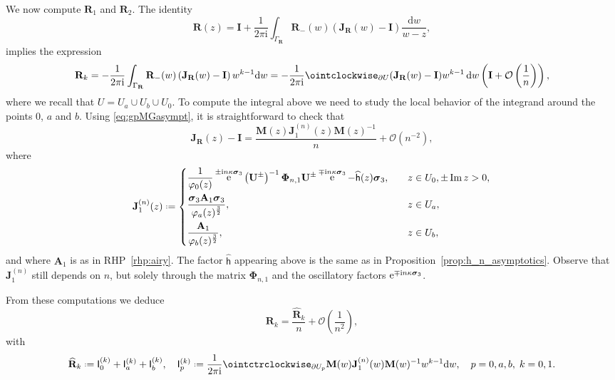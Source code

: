 \documentclass[reqno,a4paper,11pt]{amsart}
\DeclareMathOperator{\im}{Im}
\DeclareMathOperator{\ee}{\rm e}
\newcommand{\Boh}{\mathcal{O}}
\newcommand{\ii}{\mathrm{i}}
\newcommand{\dd}{\mathrm{d}}
\newcommand*{\deff}{\mathrel{\vcenter{\baselineskip0.5ex \lineskiplimit0pt
                     \hbox{\scriptsize.}\hbox{\scriptsize.}}}%
                     =}
\renewcommand{\bm}{\mathbf}
\newcommand{\msf}{\mathsf}
\newcommand{\wh}{\widehat}
\renewcommand{\sp}{\boldsymbol \sigma}
\theoremstyle{definition}
\theoremstyle{remark}
\numberwithin{equation}{section}
\newcommand*{\defeq}{\mathrel{\vcenter{\baselineskip0.5ex \lineskiplimit0pt
                     \hbox{\scriptsize.}\hbox{\scriptsize.}}}%
                     =}
\begin{document}
 We now compute $\bm R_1$ and $\bm R_2$. The identity
    \[
        \bm R(z) = \bm I + \frac{1}{2 \pi \ii} \int_{\Gamma_\bm R} \bm R_-(w) \left( \bm J_{\bm R}(w) - \bm I \right) \frac{\dd w}{w-z}, 
    \]
    implies the expression
    \[
        \bm R_k 
            = - \frac{1}{2 \pi \ii} \int_{\Gamma_\bm R} \bm R_-(w) \left( \bm J_{\bm R}(w) - \bm I \right) w^{k-1} \dd w 
            = - \frac{1}{2 \pi \ii} \ointclockwise_{\partial U} (\bm J_{\bm R}(w) - \bm I) w^{k-1}\, \dd w 
            \left( \bm I +  \Boh \left( \frac{1}{n}\right) \right),
    \]    
    where we recall that $U=U_a\cup U_b\cup U_0$.
    To compute the integral above we need to study the local behavior of the integrand around the points $0$, $a$ and $b$. Using \eqref{eq:gpMGasympt}, 
    it is straightforward to check that
    \[
        \bm J_{\bm R}(z) - \bm I = \frac{\bm M(z)\bm J_1^{(n)}(z)\bm M(z)^{-1}}{n} 
        + \Boh(n^{-2}),
    \]
    where
    \begin{equation}\label{eq:J1n}
        \bm J_1^{(n)}(z) \defeq 
            \begin{dcases}
                \frac{1}{\varphi_0(z)}\ee^{\pm \ii n\kappa \sp_3}\left(\bm U^{\pm} \right)^{-1} \bm \Phi_{n,1} \bm U^{\pm} \ee^{\mp \ii n\kappa \sp_3} -\widehat{\msf h}(z) \sp_3 , \quad 
                &z \in U_0, \pm \im z>0, \\
                  \frac{\sp_3 \bm A_1 \sp_3 }{ \varphi_a(z)^{\frac{3}{2}}}, \quad 
                &z \in U_a, \\
                 \frac{\bm A_1 }{ \varphi_b(z)^{\frac{3}{2}}}, \quad 
                &z \in U_b,
            \end{dcases}
    \end{equation}
    and where $\bm A_1$ is as in RHP~\ref{rhp:airy}.
    The factor $\wh{\msf h}$ appearing above is the same as in Proposition~\ref{prop:h_n_asymptotics}. Observe that $\bm J_1^{(n)}$ still depends on $n$, but solely through the matrix $\bm \Phi_{n,1}$ and the oscillatory factors $\ee^{\mp \ii n\kappa \sp_3}$.

From these computations we deduce
\begin{equation}\label{eq:expansionRkIk}
    \bm R_k=
         \frac{\wh{\bm R}_k}{n}  + \Boh\left(\frac{1}{n^2}\right),
\end{equation}
%
with
%
\begin{equation}\label{deff:Ikp}
\wh{\bm R}_k\deff \msf I_0^{(k)}+\msf I_a^{(k)}+\msf I_b^{(k)},\quad \msf I_p^{(k)}\deff \frac{1}{2\pi \ii}\ointctrclockwise_{\partial U_p} \bm M(w)\bm J_1^{(n)}(w)\bm M(w)^{-1} w^{k-1}\dd w,\quad p=0,a,b, \; k=0,1.
\end{equation}
\end{document}
